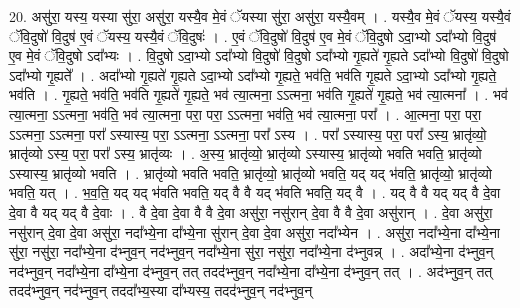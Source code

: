 \documentclass[17pt]{extarticle}
\begin{document}
20. असु॑रा॒ यस्य॒ यस्या सु॑रा॒ असु॑रा॒ यस्यै॒व मे॒वं ॅयस्या सु॑रा॒ असु॑रा॒ यस्यै॒वम् । . यस्यै॒व मे॒वं ॅयस्य॒ यस्यै॒वं ॅवि॒दुषो॑ वि॒दुष॑ ए॒वं ॅयस्य॒ यस्यै॒वं ॅवि॒दुषः॑ । . ए॒वं ॅवि॒दुषो॑ वि॒दुष॑ ए॒व मे॒वं ॅवि॒दुषो ऽदा॒भ्यो ऽदा᳚भ्यो वि॒दुष॑ ए॒व मे॒वं ॅवि॒दुषो ऽदा᳚भ्यः । . वि॒दुषो ऽदा॒भ्यो ऽदा᳚भ्यो वि॒दुषो॑ वि॒दुषो ऽदा᳚भ्यो गृ॒ह्यते॑ गृ॒ह्यते ऽदा᳚भ्यो वि॒दुषो॑ वि॒दुषो ऽदा᳚भ्यो गृ॒ह्यते᳚ । . अदा᳚भ्यो गृ॒ह्यते॑ गृ॒ह्यते ऽदा॒भ्यो ऽदा᳚भ्यो गृ॒ह्यते॒ भव॑ति॒ भव॑ति गृ॒ह्यते ऽदा॒भ्यो ऽदा᳚भ्यो गृ॒ह्यते॒ भव॑ति । . गृ॒ह्यते॒ भव॑ति॒ भव॑ति गृ॒ह्यते॑ गृ॒ह्यते॒ भव॑ त्या॒त्मना॒ ऽऽत्मना॒ भव॑ति गृ॒ह्यते॑ गृ॒ह्यते॒ भव॑ त्या॒त्मना᳚ । . भव॑ त्या॒त्मना॒ ऽऽत्मना॒ भव॑ति॒ भव॑ त्या॒त्मना॒ परा॒ परा॒ ऽऽत्मना॒ भव॑ति॒ भव॑ त्या॒त्मना॒ परा᳚ । . आ॒त्मना॒ परा॒ परा॒ ऽऽत्मना॒ ऽऽत्मना॒ परा᳚ ऽस्यास्य॒ परा॒ ऽऽत्मना॒ ऽऽत्मना॒ परा᳚ ऽस्य । . परा᳚ ऽस्यास्य॒ परा॒ परा᳚ ऽस्य॒ भ्रातृ॑व्यो॒ भ्रातृ॑व्यो ऽस्य॒ परा॒ परा᳚ ऽस्य॒ भ्रातृ॑व्यः । . अ॒स्य॒ भ्रातृ॑व्यो॒ भ्रातृ॑व्यो ऽस्यास्य॒ भ्रातृ॑व्यो भवति भवति॒ भ्रातृ॑व्यो ऽस्यास्य॒ भ्रातृ॑व्यो भवति । . भ्रातृ॑व्यो भवति भवति॒ भ्रातृ॑व्यो॒ भ्रातृ॑व्यो भवति॒ यद् यद् भ॑वति॒ भ्रातृ॑व्यो॒ भ्रातृ॑व्यो भवति॒ यत् । . भ॒व॒ति॒ यद् यद् भ॑वति भवति॒ यद् वै वै यद् भ॑वति भवति॒ यद् वै । . यद् वै वै यद् यद् वै दे॒वा दे॒वा वै यद् यद् वै दे॒वाः । . वै दे॒वा दे॒वा वै वै दे॒वा असु॑रा॒ नसु॑रान् दे॒वा वै वै दे॒वा असु॑रान् । . दे॒वा असु॑रा॒ नसु॑रान् दे॒वा दे॒वा असु॑रा॒ नदा᳚भ्ये॒ना दा᳚भ्ये॒ना सु॑रान् दे॒वा दे॒वा असु॑रा॒ नदा᳚भ्येन । . असु॑रा॒ नदा᳚भ्ये॒ना दा᳚भ्ये॒ना सु॑रा॒ नसु॑रा॒ नदा᳚भ्ये॒ना द॑भ्नुव॒न् नद॑भ्नुव॒न् नदा᳚भ्ये॒ना सु॑रा॒ नसु॑रा॒ नदा᳚भ्ये॒ना द॑भ्नुवन्न् । . अदा᳚भ्ये॒ना द॑भ्नुव॒न् नद॑भ्नुव॒न् नदा᳚भ्ये॒ना दा᳚भ्ये॒ना द॑भ्नुव॒न् तत् तदद॑भ्नुव॒न् नदा᳚भ्ये॒ना दा᳚भ्ये॒ना द॑भ्नुव॒न् तत् । . अद॑भ्नुव॒न् तत् तदद॑भ्नुव॒न् नद॑भ्नुव॒न् तददा᳚भ्य॒स्या दा᳚भ्यस्य॒ तदद॑भ्नुव॒न् नद॑भ्नुव॒न् 
\end{document}
